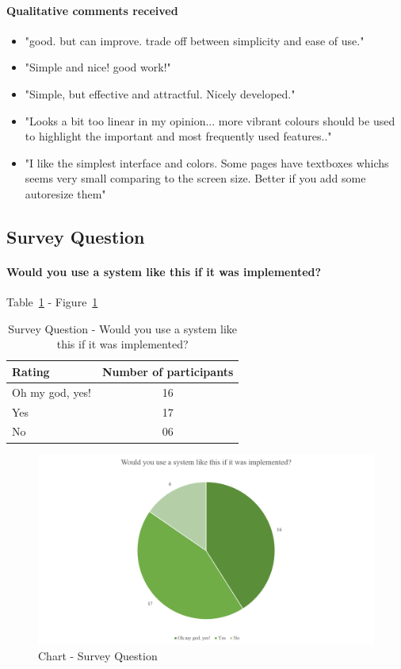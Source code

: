 \paragraph{Qualitative comments received}
\begin {itemize}
\item "good. but can improve. trade off between simplicity and ease of use."
\item "Simple and nice! good work!"
\item "Simple, but effective and attractful. Nicely developed."
\item "Looks a bit too linear in my opinion... more vibrant colours should be used to highlight the important and most frequently used features.."
\item "I like the simplest interface and colors. Some pages have textboxes whichs seems very small comparing to the screen size. Better if you add some autoresize them"
\end {itemize}



\subsection{Survey Question}

\paragraph{Would you use a system like this if it was implemented?} Table~\ref{table-survey-question-WouldYouUseASystemLikeThis} - Figure~\ref{image-questionWouldYouUse}

\begin{table} [H]
\centering
\begin{tabular}{|l|c|}
\hline
Rating & Number of participants \\
\hline
Oh my god, yes!	&16 \\
Yes	&17 \\
No	&06 \\
\hline
\end{tabular}
\caption{Survey Question - Would you use a system like this if it was implemented?}
\label{table-survey-question-WouldYouUseASystemLikeThis}
\end{table}

\begin {figure} [H]
\centering
\includegraphics [scale=0.55] {questionWouldYouUse}
\caption [Chart - Survey Question] {Chart - Survey Question}
\label {image-questionWouldYouUse}
\end {figure}






